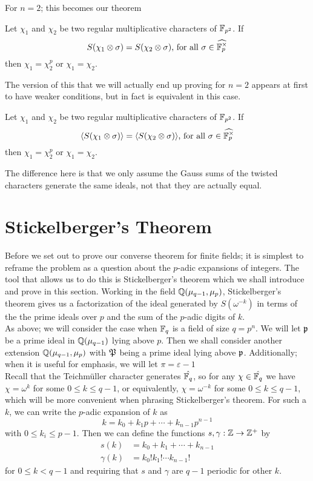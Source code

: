For $n=2$; this becomes our theorem 
\begin{theorem}\label{thm:local-converse-FF}
Let $\chi_1$ and $\chi_2$ be two regular multiplicative characters of $\mathbb{F}_{p^2}$. If \[S(\chi_1 \otimes \sigma) = S(\chi_2 \otimes \sigma)\text{, for all } \sigma \in \widehat{\mathbb{F}_p^\times}\] then $\chi_1 = \chi_2^{p}$ or $\chi_1 = \chi_2$.
\end{theorem}

The version of this that we will actually end up proving for $n = 2$ appears at first to have weaker conditions, but in fact is equivalent in this case.
\begin{theorem}\label{thm:local-converse-FF-ideal}
  Let $\chi_1$ and $\chi_2$ be two regular multiplicative characters of $\mathbb{F}_{p^2}$.
  If \[\langle S(\chi_1 \otimes \sigma) \rangle = \langle S(\chi_2 \otimes \sigma)\rangle\text{, for all } \sigma \in \widehat{\mathbb{F}_p^\times}\] then $\chi_1 = \chi_2^{p}$ or $\chi_1 = \chi_2$.
\end{theorem}
The difference here is that we only assume the Gauss sums of the twisted characters generate the same ideals, not that they are actually equal.

\section{Stickelberger's Theorem}
\label{sec:stickelberger}
Before we set out to prove our converse theorem for finite fields; it is simplest to reframe the problem as a question about the $p$-adic expansions of integers.
The tool that allows us to do this is Stickelberger's theorem which we shall introduce and prove in this section.
Working in the field $\mathbb{Q}(\mu_{q-1}, \mu_p)$, Stickelberger's theorem gives us a factorization of the ideal generated by $S(\omega^{-k})$ in terms of the the prime ideals over $p$ and the sum of the $p$-adic digits of $k$.
\\

As above; we will consider the case when $\mathbb{F}_q$ is a field of size $q = p^n$. 
We will let $\mathfrak{p}$ be a prime ideal in $\mathbb{Q}(\mu_{q-1})$ lying above $p$. 
Then we shall consider another extension $\mathbb{Q}(\mu_{q-1}, \mu_p)$ with $\mathfrak{P}$ being a prime ideal lying above $\mathfrak{p}$. Additionally; when it is useful for emphasis, we will let $\pi = \varepsilon - 1$
\\

Recall that the Teichm\"uller character generates $\hat{\mathbb{F}_q}$, so for any $\chi \in \hat{\mathbb{F}_q}$ we have $\chi = \omega^k$ for some $0 \leq k \leq q-1$, or equivalently, $\chi = \omega^{-k}$ for some $0 \leq k \leq q-1$, which will be more convenient when phrasing Stickelberger's theorem.
For such a $k$, we can write the $p$-adic expansion of $k$ as
\[k = k_0 + k_1 p + \cdots + k_{n-1}p^{n-1}\]
with $0 \leq k_i \leq p-1$. Then we can define the functions $s, \gamma : \mathbb{Z} \to \mathbb{Z}^+$ by 
\begin{align*}
s(k) &= k_0 + k_1 + \cdots + k_{n-1} \\
\gamma(k) &= k_0! k_1!  \cdots  k_{n-1}!
\end{align*}
for $0 \leq k < q-1$ and requiring that $s$ and $\gamma$ are $q-1$ periodic for other $k$.
\\

